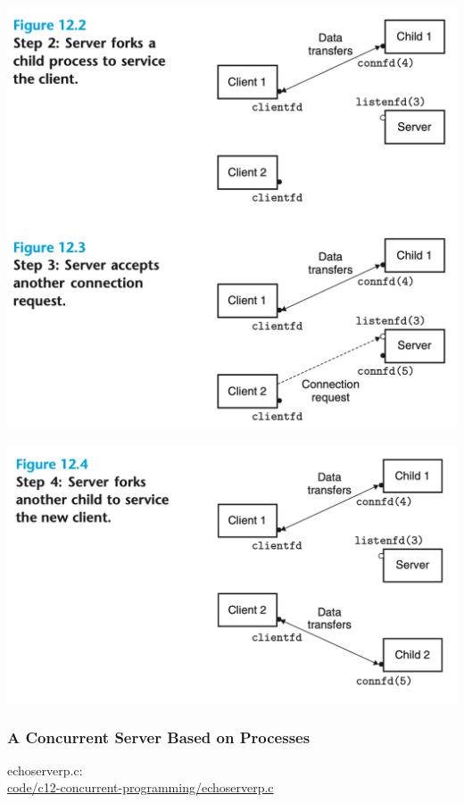 \documentclass[11pt]{article}
\begin{document}
\begin{center}
\includegraphics[width=.9\linewidth]{pics/figure12.2-3-process2-3.png}
\end{center}

\begin{center}
\includegraphics[width=.9\linewidth]{pics/figure12.4-process4.png}
\end{center}


\subsubsection{A Concurrent Server Based on Processes}
\label{sec:org87bc910}
echoserverp.c:\\

\url{code/c12-concurrent-programming/echoserverp.c}\\
\end{document}
